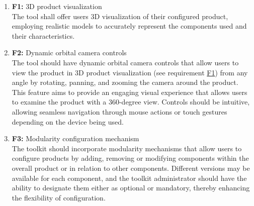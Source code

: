\begin{enumerate}
\item \textbf{F1:} \label{itm:F1} 3D product visualization
\vspace{2pt}
\\The tool shall offer users 3D visualization of their configured product, employing realistic models to accurately represent the components used and their characteristics.
\vspace{4pt}

\item \textbf{F2:} \label{itm:F2} Dynamic orbital camera controls
\vspace{2pt}
\\The tool should have dynamic orbital camera controls that allow users to view the product in 3D product visualization (see requirement \hyperref[itm:F1]{F1}) from any angle by rotating, panning, and zooming the camera around the product. This feature aims to provide an engaging visual experience that allows users to examine the product with a 360-degree view. Controls should be intuitive, allowing seamless navigation through mouse actions or touch gestures depending on the device being used.
\vspace{4pt}

\item \textbf{F3:} \label{itm:F3} Modularity configuration mechanism
\vspace{2pt}
\\The toolkit should incorporate modularity mechanisms that allow users to configure products by adding, removing or modifying components within the overall product or in relation to other components. Different versions may be available for each component, and the toolkit administrator should have the ability to designate them either as optional or mandatory, thereby enhancing the flexibility of configuration.
\vspace{4pt}


\end{enumerate}

